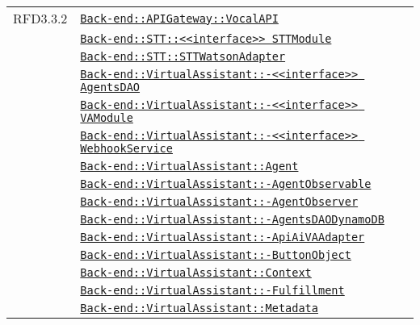 \begin{longtable}{|>{\centering}m{3cm}|m{10cm}<{\centering}|}
RFD3.3.2 & \hyperref[Back-end::APIGateway::VocalAPI]{\texttt{Back-end::APIGateway::VocalAPI}}\\
& \hyperref[Back-end::STT::<<interface>> STTModule]{\texttt{Back-end::STT::<<interface>> STTModule}}\\
& \hyperref[Back-end::STT::STTWatsonAdapter]{\texttt{Back-end::STT::STTWatsonAdapter}}\\
& \hyperref[Back-end::VirtualAssistant::<<interface>> AgentsDAO]{\texttt{Back-end::VirtualAssistant::-\linebreak <<interface>> AgentsDAO}}\\
& \hyperref[Back-end::VirtualAssistant::<<interface>> VAModule]{\texttt{Back-end::VirtualAssistant::-\linebreak <<interface>> VAModule}}\\
& \hyperref[Back-end::VirtualAssistant::<<interface>> WebhookService]{\texttt{Back-end::VirtualAssistant::-\linebreak <<interface>> WebhookService}}\\
& \hyperref[Back-end::VirtualAssistant::Agent]{\texttt{Back-end::VirtualAssistant::Agent}}\\
& \hyperref[Back-end::VirtualAssistant::AgentObservable]{\texttt{Back-end::VirtualAssistant::-\linebreak AgentObservable}}\\
& \hyperref[Back-end::VirtualAssistant::AgentObserver]{\texttt{Back-end::VirtualAssistant::-\linebreak AgentObserver}}\\
& \hyperref[Back-end::VirtualAssistant::AgentsDAODynamoDB]{\texttt{Back-end::VirtualAssistant::-\linebreak AgentsDAODynamoDB}}\\
& \hyperref[Back-end::VirtualAssistant::ApiAiVAAdapter]{\texttt{Back-end::VirtualAssistant::-\linebreak ApiAiVAAdapter}}\\
& \hyperref[Back-end::VirtualAssistant::ButtonObject]{\texttt{Back-end::VirtualAssistant::-\linebreak ButtonObject}}\\
& \hyperref[Back-end::VirtualAssistant::Context]{\texttt{Back-end::VirtualAssistant::Context}}\\
& \hyperref[Back-end::VirtualAssistant::Fulfillment]{\texttt{Back-end::VirtualAssistant::-\linebreak Fulfillment}}\\
& \hyperref[Back-end::VirtualAssistant::Metadata]{\texttt{Back-end::VirtualAssistant::Metadata}}\\

\end{longtable}
